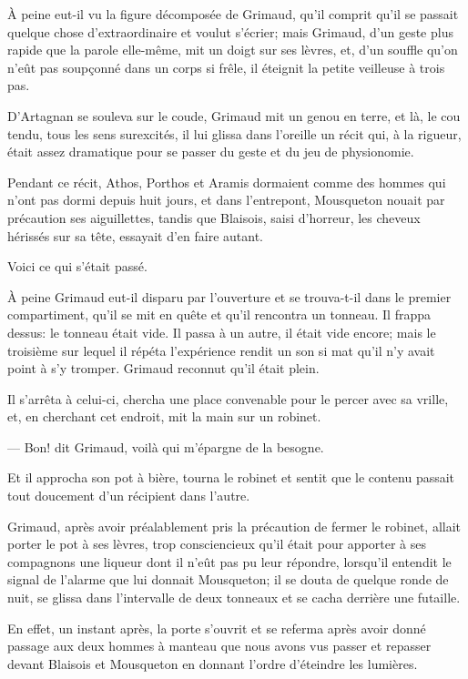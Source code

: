 À peine eut-il vu la figure décomposée de Grimaud, qu'il comprit qu'il se passait quelque chose d'extraordinaire et voulut s'écrier; mais Grimaud, d'un geste plus rapide que la parole elle-même, mit un doigt sur ses lèvres, et, d'un souffle qu'on n'eût pas soupçonné dans un corps si frêle, il éteignit la petite veilleuse à trois pas.

D'Artagnan se souleva sur le coude, Grimaud mit un genou en terre, et là, le cou tendu, tous les sens surexcités, il lui glissa dans l'oreille un récit qui, à la rigueur, était assez dramatique pour se passer du geste et du jeu de physionomie.

Pendant ce récit, Athos, Porthos et Aramis dormaient comme des hommes qui n'ont pas dormi depuis huit jours, et dans l'entrepont, Mousqueton nouait par précaution ses aiguillettes, tandis que Blaisois, saisi d'horreur, les cheveux hérissés sur sa tête, essayait d'en faire autant.

Voici ce qui s'était passé.

À peine Grimaud eut-il disparu par l'ouverture et se trouva-t-il dans le premier compartiment, qu'il se mit en quête et qu'il rencontra un tonneau. Il frappa dessus: le tonneau était vide. Il passa à un autre, il était vide encore; mais le troisième sur lequel il répéta l'expérience rendit un son si mat qu'il n'y avait point à s'y tromper. Grimaud reconnut qu'il était plein.

Il s'arrêta à celui-ci, chercha une place convenable pour le percer avec sa vrille, et, en cherchant cet endroit, mit la main sur un robinet.

— Bon! dit Grimaud, voilà qui m'épargne de la besogne.

Et il approcha son pot à bière, tourna le robinet et sentit que le contenu passait tout doucement d'un récipient dans l'autre.

Grimaud, après avoir préalablement pris la précaution de fermer le robinet, allait porter le pot à ses lèvres, trop consciencieux qu'il était pour apporter à ses compagnons une liqueur dont il n'eût pas pu leur répondre, lorsqu'il entendit le signal de l'alarme que lui donnait Mousqueton; il se douta de quelque ronde de nuit, se glissa dans l'intervalle de deux tonneaux et se cacha derrière une futaille.

En effet, un instant après, la porte s'ouvrit et se referma après avoir donné passage aux deux hommes à manteau que nous avons vus passer et repasser devant Blaisois et Mousqueton en donnant l'ordre d'éteindre les lumières.

